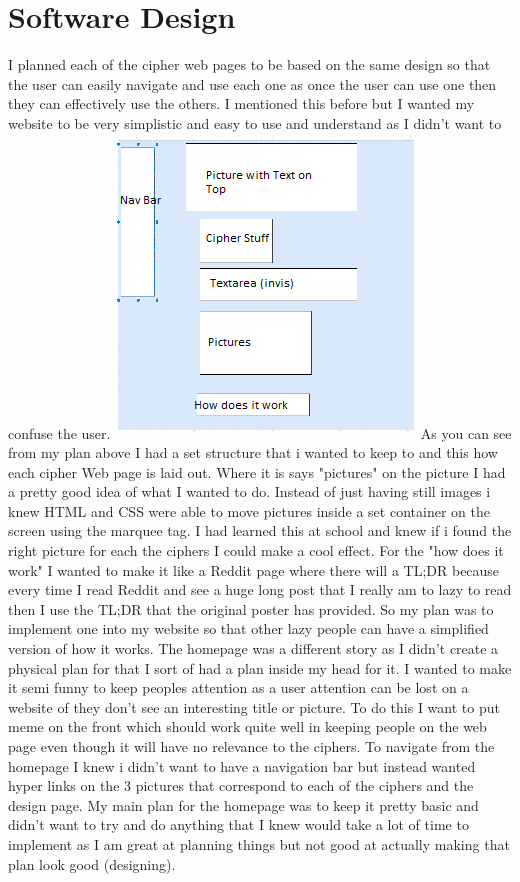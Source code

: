 \documentclass[10pt, a4paper]{article}
\begin{document}
\section {Software Design}
I planned each of the cipher web pages to be based on the same design so that the user can easily navigate and use each one as once the user can use one then they can effectively use the others. I mentioned this before but I wanted my website to be very simplistic and easy to use and understand as I didn't want to confuse the user.
\includegraphics{Capture.PNG}
As you can see from my plan above I had a set structure that i wanted to keep to and this how each cipher Web page is laid out. Where it is says "pictures" on the picture I had a pretty good idea of what I wanted to do. Instead of just having still images i knew HTML and CSS were able to move pictures inside a set container on the screen using the marquee tag. I had learned this at school and knew if i found the right picture for each the ciphers I could make a cool effect. For the "how does it work" I wanted to make it like a Reddit page where there will a TL;DR because every time I read Reddit and see a huge long post that I really am to lazy to read then I use the TL;DR that the original poster has provided. So my plan was to implement one into my website so that other lazy people can have a simplified version of how it works. The homepage was a different story as I didn't create a physical plan for that I sort of had a plan inside my head for it. I wanted to make it semi funny to keep peoples attention as a user attention can be lost on a website of they don't see an interesting title or picture. To do this I want to put meme on the front which should work quite well in keeping people on the web page even though it will have no relevance to the ciphers. To navigate from the homepage I knew i didn't want to have a navigation bar but instead wanted hyper links on the 3 pictures that correspond to each of the ciphers and the design page. My main plan for the homepage was to keep it pretty basic and didn't want to try and do anything that I knew would take a lot of time to implement as I am great at planning things but not good at actually making that plan look good (designing).
\end{document}
